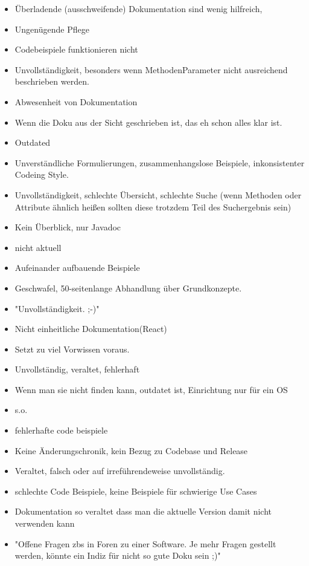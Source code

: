 \begin{multicols}{2}
\begin{itemize}
        \item Überladende (ausschweifende) Dokumentation sind wenig hilfreich,
        \item Ungenügende Pflege
        \item Codebeispiele funktionieren nicht
        \item Unvollständigkeit, besonders wenn MethodenParameter nicht ausreichend beschrieben werden.
        \item Abwesenheit von Dokumentation
        \item Wenn die Doku aus der Sicht geschrieben ist, das eh schon alles klar ist.
        \item Outdated
        \item Unverständliche Formulierungen, zusammenhangslose Beispiele, inkonsistenter Codeing Style.
        \item Unvollständigkeit, schlechte Übersicht, schlechte Suche (wenn Methoden oder Attribute ähnlich heißen sollten diese trotzdem Teil des Suchergebnis sein)
        \item Kein Überblick, nur Javadoc
        \item nicht aktuell
        \item Aufeinander aufbauende Beispiele
        \item Geschwafel, 50-seitenlange Abhandlung über Grundkonzepte.
        \item "Unvollständigkeit. ;-)"
        \item Nicht einheitliche Dokumentation(React)
        \item Setzt zu viel Vorwissen voraus.
        \item Unvollständig, veraltet, fehlerhaft
        \item Wenn man sie nicht finden kann, outdatet ist, Einrichtung nur für ein OS
        \item s.o.
        \item fehlerhafte code beispiele
        \item Keine Änderungschronik, kein Bezug zu Codebase und Release
        \item Veraltet, falsch oder auf irreführendeweise unvollständig.
        \item schlechte Code Beispiele, keine Beispiele für schwierige Use Cases
        \item Dokumentation so veraltet dass man die aktuelle Version damit nicht verwenden kann
        \item "Offene Fragen zbs in Foren zu einer Software. Je mehr Fragen gestellt werden, könnte ein Indiz für nicht so gute Doku sein ;)"

\end{itemize}
\end{multicols}
